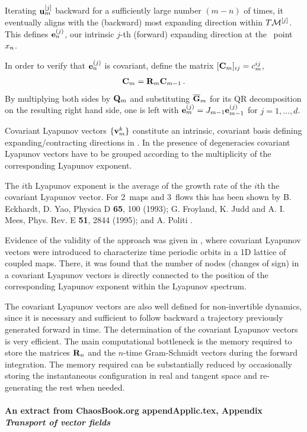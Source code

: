 Iterating ${\bf u}_m^{[j]}$ backward for a sufficiently large
number $(m-n)$ of times, it eventually aligns with the
(backward) most expanding direction within $T{\cal M}^{[j]}$. This
defines  ${\bf e}_n^{(j)}$, our intrinsic $j$-th (forward)
expanding direction at the \statesp\ point $\ssp_n$.

In order to verify that ${\bf e}_n^{(j)}$ is covariant, define
the matrix $[{\bf C}_m]_{ij} = c_m^{ij}$,
\[
{\bf C}_m = {\bf R}_m {\bf C}_{m-1}
\,.
\]
By multiplying both sides by ${\bf Q}_m$ and substituting
$\overline {\bf G}_m$ for its QR decomposition on the resulting
right hand side, one is left with ${\bf
e}_{m}^{(j)}=J_{m-1} {\bf e}_{m-1}^{(j)}$ for $j=1,\ldots,
d$.

Covariant Lyapunov vectors $\{{\bf v}_{m}^k\}$ constitute an
intrinsic, covariant basis defining expanding/contracting
directions in \statesp.
In the presence of degeneracies covariant Lyapunov vectors
have to be grouped according to the multiplicity of the
corresponding Lyapunov exponent.

The $i$th Lyapunov exponent is the average of the growth rate
of the $i$th the covariant Lyapunov vector. For 2\dmn\ maps and
3\dmn\ flows this has been shown by B. Eckhardt, D. Yao,
Physica D {\bf 65}, 100 (1993); G. Froyland, K. Judd and A. I.
Mees, Phys. Rev. E {\bf 51}, 2844 (1995); and A. Politi
\etal{}.

Evidence of the validity of the approach was given in
, where covariant Lyapunov vectors were
introduced to characterize time periodic orbits in a 1D
lattice of coupled maps. There, it was found that the number
of nodes (changes of sign) in a covariant Lyapunov vectors is
directly connected to the position of the corresponding
Lyapunov exponent within the Lyapunov spectrum.


The covariant Lyapunov vectors are also well defined for
non-invertible dynamics, since it is necessary and sufficient
to follow backward a trajectory previously generated forward in
time. The determination of the covariant Lyapunov vectors is
very efficient. The main computational bottleneck is the memory
required to store the matrices ${\bf R}_n$ and the $n$-time
Gram-Schmidt vectors during the forward integration. The memory
required can be substantially reduced by occasionally storing
the instantaneous configuration in real and tangent space and
re-generating the rest when needed.




\paragraph{
An extract from  ChaosBook.org {appendApplic.tex}, Appendix
{\em Transport of vector fields}
          }
\renewcommand{\ssp}{x}

